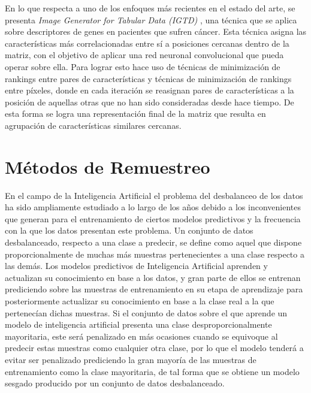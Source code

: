 En lo que respecta a uno de los enfoques más recientes en el estado del arte, se presenta \textit{Image Generator for Tabular Data (IGTD)} \cite{Zhu2021}, una técnica que se aplica sobre descriptores de genes en pacientes que sufren cáncer. Esta técnica asigna las características más correlacionadas entre sí a posiciones cercanas dentro de la matriz, con el objetivo de aplicar una red neuronal convolucional que pueda operar sobre ella. Para lograr esto hace uso de técnicas de minimización de rankings entre pares de características y técnicas de minimización de rankings entre píxeles, donde en cada iteración se reasignan pares de características a la posición de aquellas otras que no han sido consideradas desde hace tiempo. De esta forma se logra una representación final de la matriz que resulta en agrupación de características similares cercanas.

\section{Métodos de Remuestreo}
\label{SOAT_RESAMPLING}


En el campo de la Inteligencia Artificial el problema del desbalanceo de los datos ha sido ampliamente estudiado a lo largo de los años debido a los inconvenientes que generan para el entrenamiento de ciertos modelos predictivos y la frecuencia con la que los datos presentan este problema. Un conjunto de datos desbalanceado, respecto a una clase a predecir, se define como aquel que dispone proporcionalmente de muchas más muestras pertenecientes a una clase respecto a las demás. Los modelos predictivos de Inteligencia Artificial aprenden y actualizan su conocimiento en base a los datos, y gran parte de ellos se entrenan prediciendo sobre las muestras de entrenamiento en su etapa de aprendizaje para posteriormente actualizar su conocimiento en base a la clase real a la que pertenecían dichas muestras. Si el conjunto de datos sobre el que aprende un modelo de inteligencia artificial presenta una clase desproporcionalmente mayoritaria, este será penalizado en más ocasiones cuando se equivoque al predecir estas muestras como cualquier otra clase, por lo que el modelo tenderá a evitar ser penalizado prediciendo la gran mayoría de las muestras de entrenamiento como la clase mayoritaria, de tal forma que se obtiene un modelo sesgado producido por un conjunto de datos desbalanceado.

